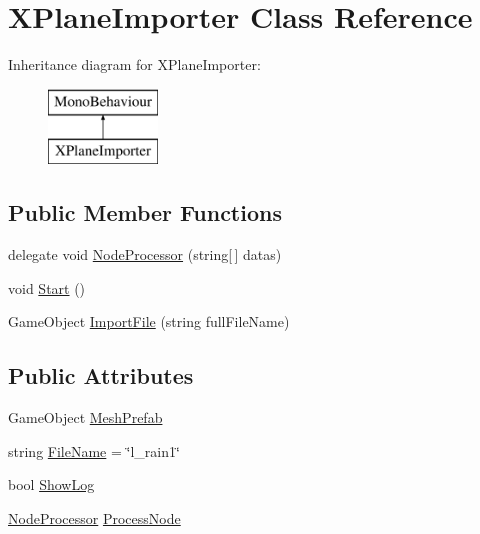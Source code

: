 \hypertarget{class_x_plane_importer}{}\section{X\+Plane\+Importer Class Reference}
\label{class_x_plane_importer}
Inheritance diagram for X\+Plane\+Importer\+:\begin{figure}[H]
\begin{center}
\leavevmode
\includegraphics[height=2.000000cm]{class_x_plane_importer}
\end{center}
\end{figure}
\subsection*{Public Member Functions}
\begin{DoxyCompactItemize}
\item 
delegate void \mbox{\hyperlink{class_x_plane_importer_a900a89814a40058c59e1f6c062bf724e}{Node\+Processor}} (string\mbox{[}$\,$\mbox{]} datas)
\item 
void \mbox{\hyperlink{class_x_plane_importer_afbcd75869e373a08dd6452cb385d0961}{Start}} ()
\item 
Game\+Object \mbox{\hyperlink{class_x_plane_importer_a772fdc0a04e6ac2c4bb85cda64d85065}{Import\+File}} (string full\+File\+Name)
\end{DoxyCompactItemize}
\subsection*{Public Attributes}
\begin{DoxyCompactItemize}
\item 
Game\+Object \mbox{\hyperlink{class_x_plane_importer_ab6eb4548431610293a67b2dc137fee4d}{Mesh\+Prefab}}
\item 
string \mbox{\hyperlink{class_x_plane_importer_ae8898b38e75dfc7d6d6ee161add4067e}{File\+Name}} = \char`\"{}l\+\_\+rain1\char`\"{}
\item 
bool \mbox{\hyperlink{class_x_plane_importer_aff6827a1593ac6524589b2985aa24615}{Show\+Log}}
\item 
\mbox{\hyperlink{class_x_plane_importer_a900a89814a40058c59e1f6c062bf724e}{Node\+Processor}} \mbox{\hyperlink{class_x_plane_importer_a2154c9f7703f60cf94bb13f03cfd078c}{Process\+Node}}
\end{DoxyCompactItemize}


